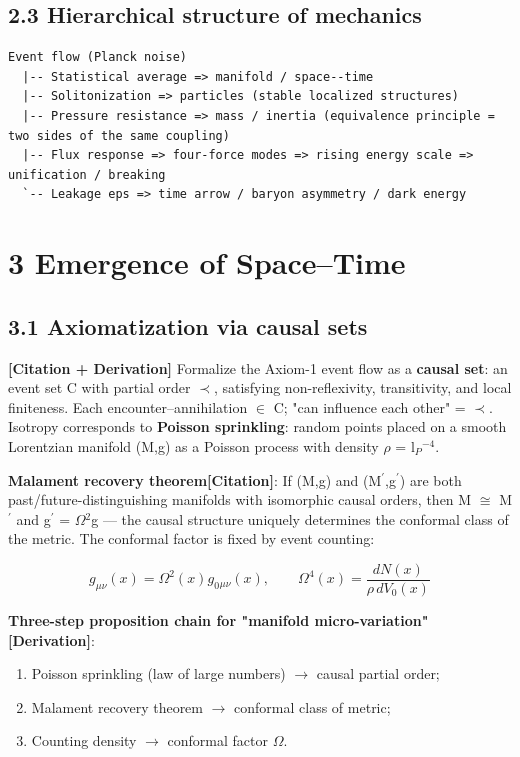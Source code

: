 \documentclass[12pt]{article}
\newcommand{\mtag}[1]{\textbf{[#1]}}
\newcommand{\up}[1]{\ensuremath{^{#1}}}
\newcommand{\down}[1]{\ensuremath{_{#1}}}
\begin{document}
\subsection{2.3 Hierarchical structure of mechanics}

\begin{verbatim}
Event flow (Planck noise)
  |-- Statistical average => manifold / space--time
  |-- Solitonization => particles (stable localized structures)
  |-- Pressure resistance => mass / inertia (equivalence principle = two sides of the same coupling)
  |-- Flux response => four-force modes => rising energy scale => unification / breaking
  `-- Leakage eps => time arrow / baryon asymmetry / dark energy
\end{verbatim}



\section{3 Emergence of Space--Time}

\subsection{3.1 Axiomatization via causal sets}

\mtag{Citation + Derivation} Formalize the Axiom-1 event flow as a \textbf{causal set}: an event set C with partial order \ensuremath{\prec}, satisfying non-reflexivity, transitivity, and local finiteness. Each encounter--annihilation \ensuremath{\in} C; "can influence each other" = \ensuremath{\prec}. Isotropy corresponds to \textbf{Poisson sprinkling}: random points placed on a smooth Lorentzian manifold (M,g) as a Poisson process with density \ensuremath{\rho} = l\down{P}\up{-4}.

\textbf{Malament recovery theorem}\mtag{Citation}: If (M,g) and (M\ensuremath{^\prime},g\ensuremath{^\prime}) are both past/future-distinguishing manifolds with isomorphic causal orders, then M \ensuremath{\cong} M\ensuremath{^\prime} and g\ensuremath{^\prime} = \ensuremath{\Omega}\up{2}g --- the causal structure uniquely determines the conformal class of the metric. The conformal factor is fixed by event counting:

\[g_{\mu\nu}(x) = \Omega^2(x)g_0{}_{\mu\nu}(x),\qquad \Omega^4(x) = \frac{dN(x)}{\rho\,dV_0(x)}\]

\textbf{Three-step proposition chain for "manifold micro-variation"}\mtag{Derivation}:
\begin{enumerate}
\item Poisson sprinkling (law of large numbers) \ensuremath{\to} causal partial order;
\item Malament recovery theorem \ensuremath{\to} conformal class of metric;
\item Counting density \ensuremath{\to} conformal factor \ensuremath{\Omega}.
\end{enumerate}
\end{document}
